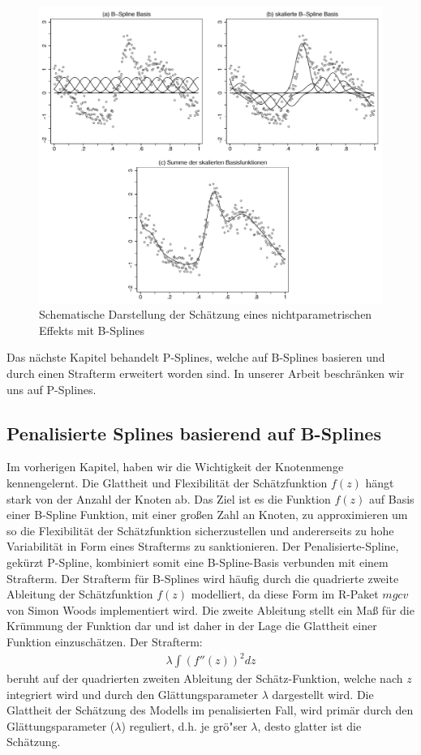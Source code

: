 \documentclass[12pt]{scrreprt}
\begin{document}
\begin{figure}[H]
\centering
\includegraphics[width=.9\textwidth]{b_spline}
\caption{Schematische Darstellung der Schätzung eines nichtparametrischen Effekts mit B-Splines}
\label{pic:b_spline}
\end{figure}

\noindent Das nächste Kapitel behandelt P-Splines, welche auf B-Splines basieren und durch einen Strafterm erweitert worden sind. In unserer Arbeit beschränken wir uns auf P-Splines.



\subsection{Penalisierte Splines basierend auf B-Splines} 
Im vorherigen Kapitel, haben wir die Wichtigkeit der Knotenmenge kennengelernt. Die Glattheit und Flexibilität der Schätzfunktion $f(z)$ hängt stark von der Anzahl der Knoten ab. Das Ziel ist es die Funktion $f(z)$ auf Basis einer B-Spline Funktion, mit einer großen Zahl an Knoten, zu approximieren um so die Flexibilität der Schätzfunktion sicherzustellen und andererseits zu hohe Variabilität in Form eines Strafterms zu sanktionieren. Der Penalisierte-Spline, gekürzt P-Spline, kombiniert somit eine B-Spline-Basis verbunden mit einem Strafterm. Der Strafterm für B-Splines wird häufig durch die quadrierte zweite Ableitung der Schätzfunktion $f(z)$ modelliert, da diese Form im R-Paket $mgcv$ von Simon Woods implementiert wird. Die zweite Ableitung stellt ein Maß für die Krümmung der Funktion dar und ist daher in der Lage die Glattheit einer Funktion einzuschätzen.
Der Strafterm: 
\begin{align}
\lambda\int(f''(z))^2dz
\end{align}
beruht auf der quadrierten zweiten Ableitung der Schätz-Funktion, welche nach $z$ integriert wird und durch den Glättungsparameter $\lambda$ dargestellt wird. Die Glattheit der Schätzung des Modells im penalisierten Fall, wird primär durch den Glättungsparameter ($\lambda$) reguliert, d.h. je grö"ser $\lambda$, desto glatter ist die Schätzung.\\
\end{document}
